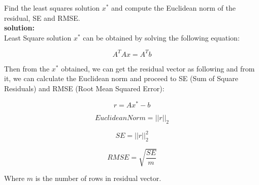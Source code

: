 \documentclass[unicode,11pt,a4paper,oneside,numbers=endperiod,openany]{scrartcl}
\newcommand{\norm}[1]{\lvert\lvert #1 \rvert\rvert}
\begin{document}
Find the least squares solution ${x^*}$ and compute the Euclidean norm of the residual, SE and RMSE. \\

\textbf{solution:} \\
Least Square solution ${x^*}$ can be obtained by solving the following equation:

\vspace{20px}

\begin{equation}
 A^TAx = A^Tb
\end{equation}

\vspace{20px}

Then from the ${x^*}$ obtained, we can get the residual vector as following and from it, we can calculate the Euclidean norm and proceed to SE (Sum of Square Residuals) and RMSE (Root Mean Squared Error):

\vspace{20px}

\begin{equation}
 r = Ax^* - b
\end{equation}

\vspace{20px}

\begin{equation}
 Euclidean Norm = \norm{r}_2
\end{equation}

\vspace{20px}

\begin{equation}
 SE = \norm{r}_2^2
\end{equation}

\vspace{20px}

\begin{equation}
 RMSE = \sqrt{\frac{SE}{m}}
\end{equation}

\vspace{20px}

Where ${m}$ is the number of rows in residual vector. \\
\end{document}
